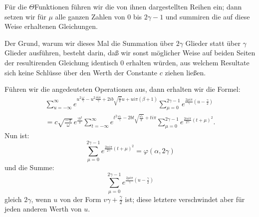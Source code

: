 \documentclass[10pt]{article}
\begin{document}
Für die \(\Theta\)Funktionen führen wir die von ihnen dargestellten Reihen ein; dann setzen wir für \(\mu\) alle ganzen Zahlen von 0 bis \(2\gamma-1\) und summiren die auf diese Weise erhaltenen Gleichungen.

Der Grund, warum wir dieses Mal die Summation über \(2\gamma\) Glieder statt über \(\gamma\) Glieder ausführen, besteht darin, daß wir sonst möglicher Weise auf beiden Seiten der resultirenden Gleichung identisch 0 erhalten würden, aus welchem Resultate sich keine Schlüsse über den Werth der Constante \(c\) ziehen ließen.

Führen wir die angedeuteten Operationen aus, dann erhalten wir die Formel:
\begin{multline*}
\sum_{u=-\infty}^{\infty}
 e^{u^{2}\frac{\omega}{\gamma}-u^{2}\frac{\delta i\pi}{\gamma}+2ib\sqrt{\frac{\omega}{\pi}}u+ui\pi(\beta+1)}
\sum_{\mu=0}^{2\gamma-1}e^{\frac{2\mu i\pi}{\gamma}\left(u-\frac{\gamma}{2}\right)}\\
=c\sqrt{\frac{-\pi}{\omega}}\,e^{\frac{\gamma b^{2}}{\pi}}
\sum_{t=-\infty}^{\infty}e^{t^{2}\frac{\omega_{1}}{\gamma}-2bt\sqrt{\frac{\omega_{1}}{\pi}}+ti\pi}
\sum_{\mu=0}^{2\gamma-1}e^{\frac{2\alpha i\pi}{2\gamma}(t+\mu)^{2}}.
\end{multline*}
Nun ist:
\[
\sum_{\mu=0}^{2\gamma-1}e^{\frac{2\alpha i\pi}{2\gamma}(t+\mu)^{2}}=\varphi(\alpha,2\gamma)
\]
und die Summe:
\[
\sum_{\mu=0}^{2\gamma-1}e^{\frac{2\mu i\pi}{\gamma}\left(u-\frac{\gamma}{2}\right)}
\]
gleich \(2\gamma\), wenn \(u\) von der Form \(v\gamma+\frac{\gamma}{2}\) ist; diese letztere verschwindet aber für jeden anderen Werth von \(u\).
\end{document}
